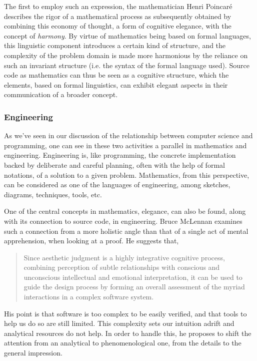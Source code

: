 The first to employ such an expression, the mathematician Henri Poincaré describes the rigor of a mathematical process as subsequently obtained by combining this economy of thought, a form of cognitive elegance, with the concept of \emph{harmony}\cite{poincare_science_1908}. By virtue of mathematics being based on formal languages, this linguistic component introduces a certain kind of structure, and the complexity of the problem domain is made more harmonious by the reliance on such an invariant structure (i.e. the syntax of the formal language used). Source code as mathematics can thus be seen as a cognitive structure, which the elements, based on formal linguistics, can exhibit elegant aspects in their communication of a broader concept.

\subsubsection{Engineering} %

As we've seen in our discussion of the relationship between computer science and programming, one can see in these two activities a parallel in mathematics and engineering. Engineering is, like programming, the concrete implementation backed by deliberate and careful planning, often with the help of formal notations, of a solution to a given problem. Mathematics, from this perspective, can be considered as one of the languages of engineering, among sketches, diagrams, techniques, tools, etc.

One of the central concepts in mathematics, elegance, can also be found, along with its connection to source code, in engineering. Bruce McLennan examines such a connection from a more holistic angle than that of a single act of mental apprehension, when looking at a proof. He suggests that,

\begin{quote}
  Since aesthetic judgment is a highly integrative cognitive process, combining perception of subtle relationships with conscious and unconscious intellectual and emotional interpretation, it can be used to guide the design process by forming an overall assessment of the myriad interactions in a complex software system.\cite{schummer_aesthetic_2009}
\end{quote}

His point is that software is too complex to be easily verified, and that tools to help us do so are still limited. This complexity sets our intuition adrift and analytical resources do not help. In order to handle this, he proposes to shift the attention from an analytical to phenomenological one, from the details to the general impression.

